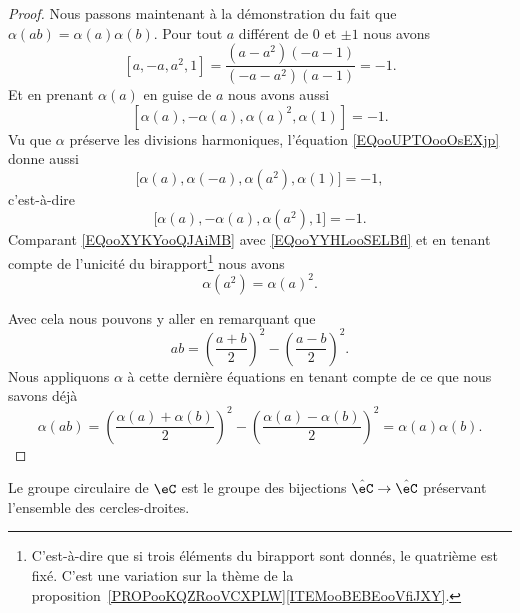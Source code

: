 \begin{proof}
    Nous passons maintenant à la démonstration du fait que \( \alpha(ab)=\alpha(a)\alpha(b)\). Pour tout \( a\) différent de \( 0\) et \( \pm 1\) nous avons
    \begin{equation}        \label{EQooUPTOooOsEXjp}
        [a,-a,a^2,1]=\frac{ (a-a^2)(-a-1) }{ (-a-a^2)(a-1) }=-1.
    \end{equation}
    Et en prenant \( \alpha(a)\) en guise de \( a\) nous avons aussi
    \begin{equation}        \label{EQooXYKYooQJAiMB}
        [\alpha(a),-\alpha(a),\alpha(a)^2,\alpha(1)]=-1.
    \end{equation}
    Vu que \( \alpha\) préserve les divisions harmoniques, l'équation \eqref{EQooUPTOooOsEXjp} donne aussi
    \begin{equation}
        \big[ \alpha(a),\alpha(-a),\alpha(a^2),\alpha(1) \big]=-1,
    \end{equation}
    c'est-à-dire
    \begin{equation}    \label{EQooYYHLooSELBfl}
        \big[ \alpha(a),-\alpha(a),\alpha(a^2),1 \big]=-1.
    \end{equation}
    Comparant \eqref{EQooXYKYooQJAiMB} avec \eqref{EQooYYHLooSELBfl} et en tenant compte de l'unicité du birapport\footnote{C'est-à-dire que si trois éléments du birapport sont donnés, le quatrième est fixé. C'est une variation sur la thème de la proposition~\ref{PROPooKQZRooVCXPLW}\ref{ITEMooBEBEooVfiJXY}.} nous avons
    \begin{equation}
        \alpha(a^2)=\alpha(a)^2.
    \end{equation}

    Avec cela nous pouvons y aller en remarquant que
    \begin{equation}
        ab=\left( \frac{ a+b }{2} \right)^2-\left( \frac{ a-b }{2} \right)^2.
    \end{equation}
    Nous appliquons \( \alpha\) à cette dernière équations en tenant compte de ce que nous savons déjà
    \begin{equation}
        \alpha(ab)=\left( \frac{ \alpha(a)+\alpha(b) }{2} \right)^2-\left( \frac{ \alpha(a)-\alpha(b) }{2} \right)^2=\alpha(a)\alpha(b).
    \end{equation}
\end{proof}

\begin{theorem}       \label{THOooKMKWooZPIDaK}
    Le groupe circulaire de \( \eC\) est le groupe des bijections \( \hat\eC\to\hat \eC\) préservant l'ensemble des cercles-droites.
\end{theorem}

